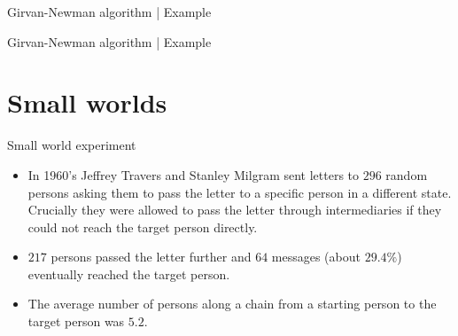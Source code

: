 \documentclass[
    hyperref={colorlinks,linkcolor=blue,urlcolor=blue,citecolor=blue}
]{beamer}
\begin{document}
\begin{frame}{Girvan-Newman algorithm | Example}
\begin{center}
\end{center}
\end{frame}

\begin{frame}{Girvan-Newman algorithm | Example}
\begin{center}
\end{center}
\end{frame}

\section{Small worlds}

\begin{frame}{Small world experiment}
\begin{itemize}
    \item<1-> In 1960's Jeffrey Travers and Stanley Milgram sent letters
    to $296$ random persons asking them to pass the letter to a specific
    person in a different state. Crucially they were allowed to pass the
    letter through intermediaries if they could not reach the target person
    directly.
    \item<2-> $217$ persons passed the letter further and $64$ messages
    (about $29.4\%$) eventually reached the target person.
    \item<3-> The average number of persons along a chain from a starting
    person to the target person was $5.2$.
\end{itemize}
\end{frame}
\end{document}
